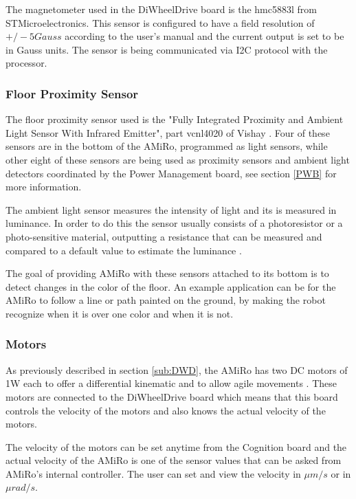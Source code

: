 \documentclass[12pt]{report}%
\begin{document}
The magnetometer used in the DiWheelDrive board is the hmc5883l from STMicroelectronics. This sensor is configured to have a field resolution of $+/-5Gauss$ according to the user's manual \cite{magnetometerpart} and the current output is set to be in Gauss units. The sensor is being communicated via I2C protocol with the processor.

\subsubsection{Floor Proximity Sensor}
\label{sec:AMS}
The floor proximity sensor used is the "Fully Integrated Proximity and Ambient Light Sensor With Infrared Emitter", part vcnl4020 of Vishay \cite{proxsensor}. Four of these sensors are in the bottom of the AMiRo, programmed as light sensors, while other eight of these sensors are being used as proximity sensors and ambient light detectors coordinated by the Power Management board, see section \ref{PWB} for more information.

The ambient light sensor measures the intensity of light and its is measured in luminance. In order to do this the sensor usually consists of a photoresistor or a photo-sensitive material, outputting a resistance that can be measured and compared to a default value to estimate the luminance \cite{amstheory}.

The goal of providing AMiRo with these sensors attached to its bottom is to detect changes in the color of the floor. An example application can be for the AMiRo to follow a line or path painted on the ground, by making the robot recognize when it is over one color and when it is not.

\subsubsection{Motors}
As previously described in section \ref{sub:DWD}, the AMiRo has two DC motors of 1W each to offer a differential kinematic and to allow agile movements \cite{AMiRo_paper_modular}. These motors are connected to the DiWheelDrive board which means that this board controls the velocity of the motors and also knows the actual velocity of the motors.

The velocity of the motors can be set anytime from the Cognition board and the actual velocity of the AMiRo is one of the sensor values that can be asked from AMiRo's internal controller. The user can set and view the velocity in $\mu m/s$ or in $\mu rad/s$.
\end{document}
